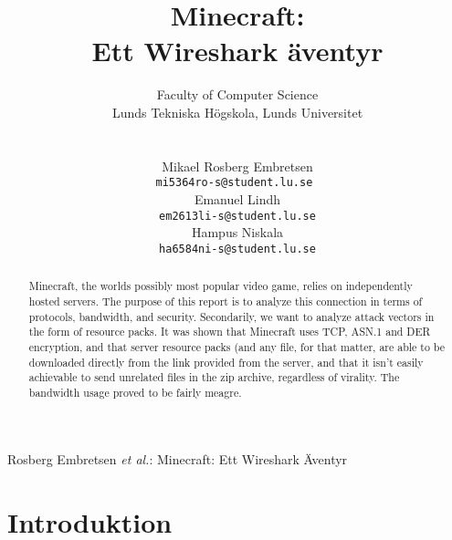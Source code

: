 \documentclass[journal,comsoc]{IEEEtran}
\begin{document}
\title{Minecraft:\\ Ett Wireshark äventyr}

\author{\vspace*{ 0.25 in} 
\parbox{6 in}{\centering Faculty of Computer Science \\
               \centering Lunds Tekniska Högskola, Lunds Universitet}  \\
\vspace*{ 0.25 in} 
\parbox{2 in}{ \centering Mikael Rosberg Embretsen \\
{\tt\small  mi5364ro-s@student.lu.se }}
\parbox{2 in}{\centering Emanuel Lindh \\
{\tt\small em2613li-s@student.lu.se}}
\parbox{2 in}{ \centering Hampus Niskala \\
{\tt\small ha6584ni-s@student.lu.se}}}

%
{Rosberg Embretsen \MakeLowercase{\textit{et al.}}: Minecraft: Ett Wireshark Äventyr}

\maketitle

\begin{abstract}
  Minecraft, the worlds possibly most popular video game, relies on independently hosted servers. The purpose of this report is to analyze this connection in terms of protocols, bandwidth, and security. Secondarily, we want to analyze attack vectors in the form of resource packs.
  It was shown that Minecraft uses TCP, ASN.1 and DER encryption, and that server resource packs (and any file, for that matter, are able to be downloaded directly from the link provided from the server, and that it isn't easily achievable to send unrelated files in the zip archive, regardless of virality. The bandwidth usage proved to be fairly meagre.

\end{abstract}

\section{Introduktion}
\end{document}
